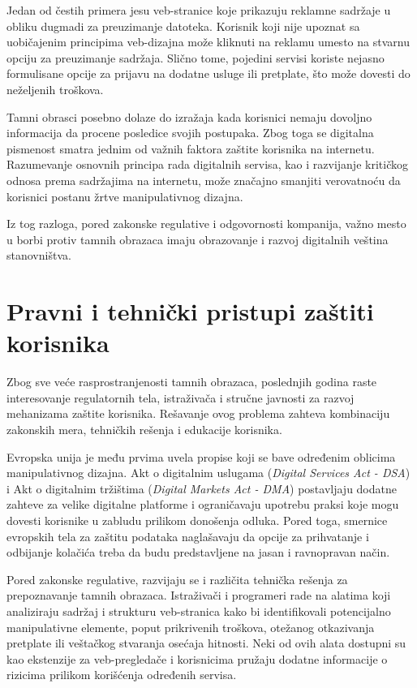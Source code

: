 \documentclass[12pt,a4paper]{article}
\begin{document}
Jedan od čestih primera jesu veb-stranice koje prikazuju reklamne sadržaje u obliku dugmadi za preuzimanje datoteka. Korisnik koji nije upoznat sa uobičajenim principima veb-dizajna može kliknuti na reklamu umesto na stvarnu opciju za preuzimanje sadržaja. Slično tome, pojedini servisi koriste nejasno formulisane opcije za prijavu na dodatne usluge ili pretplate, što može dovesti do neželjenih troškova.

Tamni obrasci posebno dolaze do izražaja kada korisnici nemaju dovoljno informacija da procene posledice svojih postupaka. Zbog toga se digitalna pismenost smatra jednim od važnih faktora zaštite korisnika na internetu. Razumevanje osnovnih principa rada digitalnih servisa, kao i razvijanje kritičkog odnosa prema sadržajima na internetu, može značajno smanjiti verovatnoću da korisnici postanu žrtve manipulativnog dizajna.

Iz tog razloga, pored zakonske regulative i odgovornosti kompanija, važno mesto u borbi protiv tamnih obrazaca imaju obrazovanje i razvoj digitalnih veština stanovništva.

\section{Pravni i tehnički pristupi zaštiti korisnika}

Zbog sve veće rasprostranjenosti tamnih obrazaca, poslednjih godina raste interesovanje regulatornih tela, istraživača i stručne javnosti za razvoj mehanizama zaštite korisnika. Rešavanje ovog problema zahteva kombinaciju zakonskih mera, tehničkih rešenja i edukacije korisnika.

Evropska unija je među prvima uvela propise koji se bave određenim oblicima manipulativnog dizajna. Akt o digitalnim uslugama (\emph{Digital Services Act - DSA}) i Akt o digitalnim tržištima (\emph{Digital Markets Act - DMA}) postavljaju dodatne zahteve za velike digitalne platforme i ograničavaju upotrebu praksi koje mogu dovesti korisnike u zabludu prilikom donošenja odluka. Pored toga, smernice evropskih tela za zaštitu podataka naglašavaju da opcije za prihvatanje i odbijanje kolačića treba da budu predstavljene na jasan i ravnopravan način.

Pored zakonske regulative, razvijaju se i različita tehnička rešenja za prepoznavanje tamnih obrazaca. Istraživači i programeri rade na alatima koji analiziraju sadržaj i strukturu veb-stranica kako bi identifikovali potencijalno manipulativne elemente, poput prikrivenih troškova, otežanog otkazivanja pretplate ili veštačkog stvaranja osećaja hitnosti. Neki od ovih alata dostupni su kao ekstenzije za veb-pregledače i korisnicima pružaju dodatne informacije o rizicima prilikom korišćenja određenih servisa.
\end{document}
